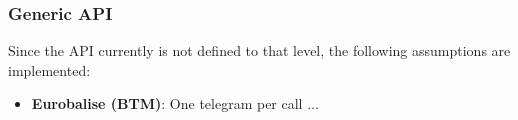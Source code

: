 
\subsubsection{Generic API}
Since the API currently is not defined to that level, the following assumptions are implemented:
\begin{itemize}
\item \textbf{Eurobalise (BTM)}: One telegram per call ...
\end{itemize}